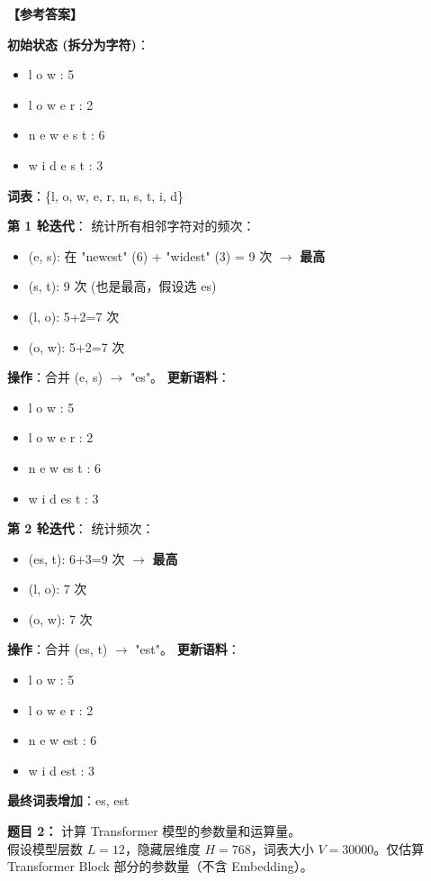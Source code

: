 \documentclass[a4paper,11pt]{article}
\newenvironment{question}[1]
    {\vspace{0.5cm}\noindent\textbf{题目 #1：}}
    {\vspace{0.2cm}}
\newenvironment{answer}
    {\noindent\textbf{【参考答案】}\par\small\color{blue}}
    {\par\vspace{0.5cm}\normalcolor}
\begin{document}
\begin{answer}
\textbf{初始状态 (拆分为字符)}：
\begin{itemize}
    \item l o w : 5
    \item l o w e r : 2
    \item n e w e s t : 6
    \item w i d e s t : 3
\end{itemize}
\textbf{词表}：\{l, o, w, e, r, n, s, t, i, d\}

\textbf{第 1 轮迭代}：
统计所有相邻字符对的频次：
\begin{itemize}
    \item (e, s): 在 "newest" (6) + "widest" (3) = 9 次 $\to$ \textbf{最高}
    \item (s, t): 9 次 (也是最高，假设选 es)
    \item (l, o): 5+2=7 次
    \item (o, w): 5+2=7 次
\end{itemize}
\textbf{操作}：合并 (e, s) $\to$ "es"。
\textbf{更新语料}：
\begin{itemize}
    \item l o w : 5
    \item l o w e r : 2
    \item n e w es t : 6
    \item w i d es t : 3
\end{itemize}

\textbf{第 2 轮迭代}：
统计频次：
\begin{itemize}
    \item (es, t): 6+3=9 次 $\to$ \textbf{最高}
    \item (l, o): 7 次
    \item (o, w): 7 次
\end{itemize}
\textbf{操作}：合并 (es, t) $\to$ "est"。
\textbf{更新语料}：
\begin{itemize}
    \item l o w : 5
    \item l o w e r : 2
    \item n e w est : 6
    \item w i d est : 3
\end{itemize}
\textbf{最终词表增加}：es, est
\end{answer}

\begin{question}{2}
计算 Transformer 模型的参数量和运算量。\\
假设模型层数 $L=12$，隐藏层维度 $H=768$，词表大小 $V=30000$。仅估算 Transformer Block 部分的参数量（不含 Embedding）。
\end{question}
\end{document}
